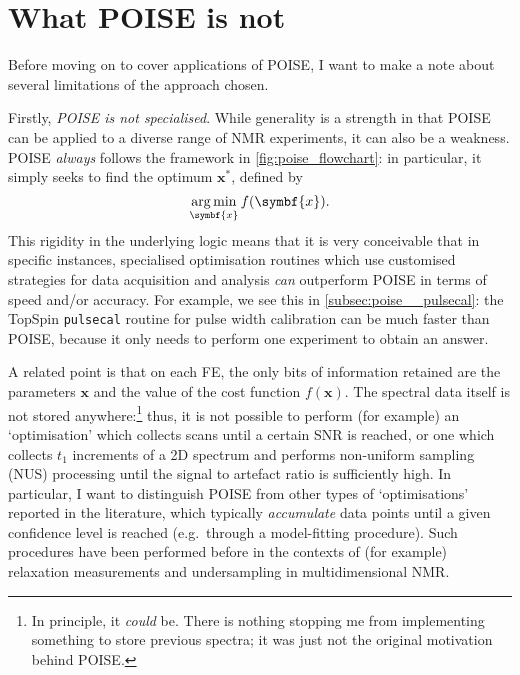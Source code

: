 \section{What POISE is not}
\label{sec:poise__notpoise}

Before moving on to cover applications of POISE, I want to make a note about several limitations of the approach chosen. 

Firstly, \textit{POISE is not specialised}.
While generality is a strength in that POISE can be applied to a diverse range of NMR experiments, it can also be a weakness.
POISE \textit{always} follows the framework in \cref{fig:poise_flowchart}: in particular, it simply seeks to find the optimum $\symbf{x}^*$, defined by
\begin{equation}
    \label{eq:poise_argmin}
    \argmin_{\symbf{x}} f(\symbf{x}).
\end{equation}
This rigidity in the underlying logic means that it is very conceivable that in specific instances, specialised optimisation routines which use customised strategies for data acquisition and analysis \textit{can} outperform POISE in terms of speed and/or accuracy.
For example, we see this in \cref{subsec:poise__pulsecal}: the TopSpin \texttt{pulsecal} routine for pulse width calibration can be much faster than POISE, because it only needs to perform one experiment to obtain an answer.

A related point is that on each FE, the only bits of information retained are the parameters $\symbf{x}$ and the value of the cost function $f(\symbf{x})$.
The spectral data itself is not stored anywhere:\footnote{In principle, it \textit{could} be. There is nothing stopping me from implementing something to store previous spectra; it was just not the original motivation behind POISE.} thus, it is not possible to perform (for example) an `optimisation' which collects scans until a certain SNR is reached, or one which collects $t_1$ increments of a 2D spectrum and performs non-uniform sampling (NUS) processing until the signal to artefact ratio is sufficiently high.
In particular, I want to distinguish POISE from other types of `optimisations' reported in the literature, which typically \textit{accumulate} data points until a given confidence level is reached (e.g.\ through a model-fitting procedure).
Such procedures have been performed before in the contexts of (for example) relaxation measurements\autocite{Song2018JMR,Tang2019SR} and undersampling in multidimensional NMR\autocite{Eghbalnia2005JACS,Hansen2016ACIE,BrukerSmartDriveNMR}.

